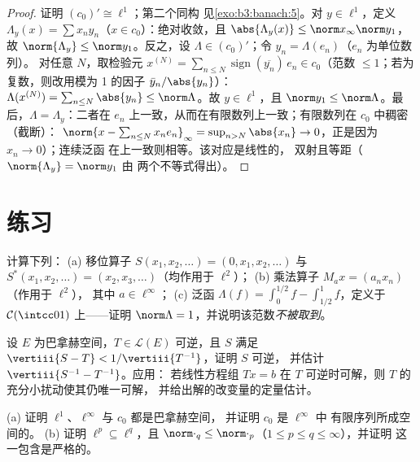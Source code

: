 \begin{proof}
证明 $(c_0)' \cong \ell^1$；第二个同构
见\cref{exo:b3:banach:5}。对 $y \in \ell^1$，定义 $\Lambda_y(x)
= \sum x_ny_n$（$x \in c_0$）：绝对收敛，且
$\abs{\Lambda_y(x)} \leq \norm x_\infty\norm y_1$，故
$\norm{\Lambda_y} \leq \norm y_1$。反之，设 $\Lambda \in
(c_0)'$；令 $y_n = \Lambda(e_n)$（$e_n$ 为单位数列）。
对任意 $N$，取检验元 $x^{(N)} = \sum_{n \leq N}
\operatorname{sign}(\overline{y_n})\,e_n \in c_0$（范数 $\leq
1$；若为复数，则改用模为 1 的因子 $\bar y_n/\abs
{y_n}$）：$\Lambda(x^{(N)}) = \sum_{n\leq N}\abs{y_n} \leq
\norm\Lambda$。故 $y \in \ell^1$，且 $\norm y_1 \leq
\norm\Lambda$。最后，$\Lambda = \Lambda_y$：二者在
$e_n$ 上一致，从而在有限数列上一致；有限数列在 $c_0$ 中稠密（截断）：
$\norm{x - \sum_{n \leq N}x_ne_n}_\infty = \sup_{n > N}\abs{x_n}
\to 0$，正是因为 $x_n \to 0$）；连续泛函
在上一致则相等。该对应是线性的，
双射且等距（$\norm{\Lambda_y} = \norm y_1$ 由
两个不等式得出）。
\end{proof}

\section{练习}

\begin{exercise}[$\star$]\label{exo:b3:banach:1}
计算下列：
(a) 移位算子 $S(x_1, x_2, \dots) = (0, x_1, x_2, \dots)$ 与
$S^*(x_1, x_2, \dots) = (x_2, x_3, \dots)$（均作用于 $\ell^2$）；
(b) 乘法算子 $M_a x = (a_nx_n)$（作用于 $\ell^2$），
其中 $a \in \ell^\infty$；
(c) 泛函 $\Lambda(f) = \int_0^{1/2}f -
\int_{1/2}^1f$，定义于 $\mathcal C(\intcc01)$ 上——证明
$\norm\Lambda = 1$，并说明该范数\emph{不被取到}。
\end{exercise}

\begin{exercise}[$\star$]\label{exo:b3:banach:2}
设 $E$ 为巴拿赫空间，$T \in \mathcal L(E)$ 可逆，且 $S$
满足 $\vertiii{S - T} < 1/\vertiii{T^{-1}}$，证明 $S$ 可逆，
并估计 $\vertiii{S^{-1} - T^{-1}}$。应用：
若线性方程组 $Tx = b$ 在 $T$ 可逆时可解，则
$T$ 的充分小扰动使其仍唯一可解，
并给出解的改变量的定量估计。
\end{exercise}

\begin{exercise}[$\star\star$]\label{exo:b3:banach:3}
(a) 证明 $\ell^1$、$\ell^\infty$ 与 $c_0$ 都是巴拿赫空间，
并证明 $c_0$ 是 $\ell^\infty$ 中
有限序列所成空间的。
(b) 证明 $\ell^p \subseteq \ell^q$，且 $\norm\cdot_q \leq
\norm\cdot_p$（$1 \leq p \leq q \leq \infty$），并证明
这一包含是严格的。
\end{exercise}

